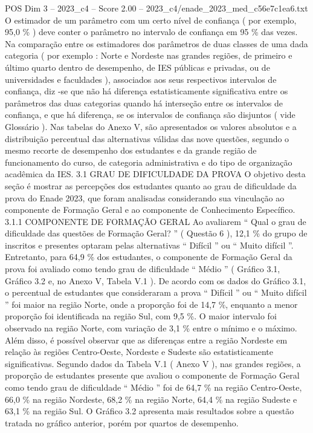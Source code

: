 \begin{textsample}{POS Dim 3 – 2023\_c4 – Score 2.00 – 2023\_c4/enade\_2023\_med\_c56e7c1ea6.txt}
O estimador de um parâmetro com um certo nível de confiança ( por exemplo, 95,0 \% ) deve conter o parâmetro no intervalo de confiança em 95 \% das vezes.
Na comparação entre os estimadores dos parâmetros de duas classes de uma dada categoria ( por exemplo : Norte e Nordeste nas grandes regiões, de primeiro e último quarto dentro de desempenho, de IES públicas e privadas, ou de universidades e faculdades ), associados aos seus respectivos intervalos de confiança, diz -se que não há diferença estatisticamente significativa entre os parâmetros das duas categorias quando há interseção entre os intervalos de confiança, e que há diferença, se os intervalos de confiança são disjuntos ( vide Glossário ).
Nas tabelas do Anexo V, são apresentados os valores absolutos e a distribuição percentual das alternativas válidas das nove questões, segundo o mesmo recorte de desempenho dos estudantes e da grande região de funcionamento do curso, de categoria administrativa e do tipo de organização acadêmica da IES. 3.1 GRAU DE DIFICULDADE DA PROVA O objetivo desta seção é mostrar as percepções dos estudantes quanto ao grau de dificuldade da prova do Enade 2023, que foram analisadas considerando sua vinculação ao componente de Formação Geral e ao componente de Conhecimento Específico. 3.1.1 COMPONENTE DE FORMAÇÃO GERAL Ao avaliarem “ Qual o grau de dificuldade das questões de Formação Geral? ” ( Questão 6 ), 12,1 \% do grupo de inscritos e presentes optaram pelas alternativas “ Difícil ” ou “ Muito difícil ”.
Entretanto, para 64,9 \% dos estudantes, o componente de Formação Geral da prova foi avaliado como tendo grau de dificuldade “ Médio ” ( Gráfico 3.1, Gráfico 3.2 e, no Anexo V, Tabela V.1 ).
De acordo com os dados do Gráfico 3.1, o percentual de estudantes que consideraram a prova “ Difícil ” ou “ Muito difícil ” foi maior na região Norte, onde a proporção foi de 14,7 \%, enquanto a menor proporção foi identificada na região Sul, com 9,5 \%.
O maior intervalo foi observado na região Norte, com variação de 3,1 \% entre o mínimo e o máximo.
Além disso, é possível observar que as diferenças entre a região Nordeste em relação às regiões Centro-Oeste, Nordeste e Sudeste são estatisticamente significativas.
Segundo dados da Tabela V.1 ( Anexo V ), nas grandes regiões, a proporção de estudantes presente que avaliou o componente de Formação Geral como tendo grau de dificuldade “ Médio ” foi de 64,7 \% na região Centro-Oeste, 66,0 \% na região Nordeste, 68,2 \% na região Norte, 64,4 \% na região Sudeste e 63,1 \% na região Sul.
O Gráfico 3.2 apresenta mais resultados sobre a questão tratada no gráfico anterior, porém por quartos de desempenho.

\end{textsample}
